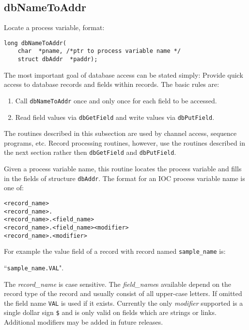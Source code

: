 \subsection{dbNameToAddr}

Locate a process variable, format:

\begin{verbatim}
long dbNameToAddr(
    char  *pname, /*ptr to process variable name */
    struct dbAddr  *paddr);
\end{verbatim}

The most important goal of database access can be stated simply:
Provide quick access to database records and fields within records.
The basic rules are:

\begin{enumerate}

\item Call \verb|dbNameToAddr| once and only once for each field to be accessed.

\item Read field values via \verb|dbGetField| and write values via \verb|dbPutField|.

\end{enumerate}

The routines described in this subsection are used by channel access, sequence programs, etc.
Record processing routines, however, use the routines described in the next section rather then \verb|dbGetField| and \verb|dbPutField|.

Given a process variable name, this routine locates the process variable and fills in the fields of structure \verb|dbAddr|.
The format for an IOC process variable name is one of:

\begin{verbatim}
<record_name>
<record_name>.
<record_name>.<field_name>
<record_name>.<field_name><modifier>
<record_name>.<modifier>
\end{verbatim}

For example the value field of a record with record named \verb|sample_name| is:

       ``\verb|sample_name.VAL|".

The \emph{record\_name} is case sensitive.
The \emph{field\_name}s available depend on the record type of the record and usually consist of all upper-case letters.
If omitted the field name \verb|VAL| is used if it exists.
Currently the only \emph{modifier} supported is a single dollar sign \verb|$| and is only valid on fields which are strings or links.
Additional modifiers may be added in future releases.

